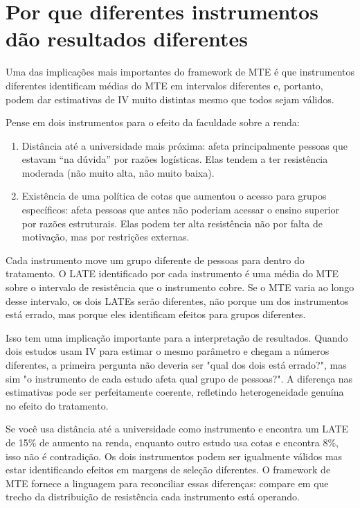 \section{Por que diferentes instrumentos dão resultados diferentes}
\label{sec:mte_late}

Uma das implicações mais importantes do framework de MTE é que instrumentos diferentes identificam médias do MTE em intervalos diferentes e, portanto, podem dar estimativas de IV muito distintas mesmo que todos sejam válidos.

Pense em dois instrumentos para o efeito da faculdade sobre a renda:
\begin{enumerate}[leftmargin=*]
  \item Distância até a universidade mais próxima: afeta principalmente pessoas que estavam ``na dúvida'' por razões logísticas. Elas tendem a ter resistência moderada (não muito alta, não muito baixa).
  \item Existência de uma política de cotas que aumentou o acesso para grupos específicos: afeta pessoas que antes não poderiam acessar o ensino superior por razões estruturais. Elas podem ter alta resistência não por falta de motivação, mas por restrições externas.
\end{enumerate}

Cada instrumento move um grupo diferente de pessoas para dentro do tratamento. O LATE identificado por cada instrumento é uma média do MTE sobre o intervalo de resistência que o instrumento cobre. Se o MTE varia ao longo desse intervalo, os dois LATEs serão diferentes, não porque um dos instrumentos está errado, mas porque eles identificam efeitos para grupos diferentes.

Isso tem uma implicação importante para a interpretação de resultados. Quando dois estudos usam IV para estimar o mesmo parâmetro e chegam a números diferentes, a primeira pergunta não deveria ser "qual dos dois está errado?", mas sim "o instrumento de cada estudo afeta qual grupo de pessoas?". A diferença nas estimativas pode ser perfeitamente coerente, refletindo heterogeneidade genuína no efeito do tratamento.

\begin{atencaobox}
Se você usa distância até a universidade como instrumento e encontra um LATE de 15\% de aumento na renda, enquanto outro estudo usa cotas e encontra 8\%, isso não é contradição. Os dois instrumentos podem ser igualmente válidos mas estar identificando efeitos em margens de seleção diferentes. O framework de MTE fornece a linguagem para reconciliar essas diferenças: compare em que trecho da distribuição de resistência cada instrumento está operando.
\end{atencaobox}

